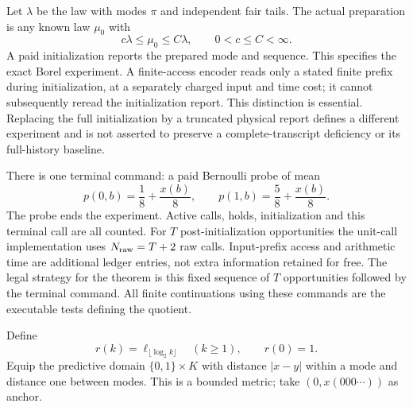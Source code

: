 Let $\lambda$ be the law with modes $\pi$ and independent fair tails. The actual preparation is any known law $\mu_0$ with
\begin{equation}\label{eq:nr-preparation}
 c\lambda\le\mu_0\le C\lambda,\qquad 0<c\le C<\infty.
\end{equation}
A paid initialization reports the prepared mode and sequence. This specifies the exact Borel experiment. A finite-access encoder reads only a stated finite prefix during initialization, at a separately charged input and time cost; it cannot subsequently reread the initialization report. This distinction is essential. Replacing the full initialization by a truncated physical report defines a different experiment and is not asserted to preserve a complete-transcript deficiency or its full-history baseline.

There is one terminal command: a paid Bernoulli probe of mean
\begin{equation}\label{eq:nr-score}
 p(0,b)=\frac18+\frac{x(b)}8,\qquad
 p(1,b)=\frac58+\frac{x(b)}8.
\end{equation}
The probe ends the experiment. Active calls, holds, initialization and this terminal call are all counted. For $T$ post-initialization opportunities the unit-call implementation uses $N_{\rm raw}=T+2$ raw calls. Input-prefix access and arithmetic time are additional ledger entries, not extra information retained for free. The legal strategy for the theorem is this fixed sequence of $T$ opportunities followed by the terminal command. All finite continuations using these commands are the executable tests defining the quotient.

Define
\begin{equation}\label{eq:nr-moran-profile}
 r(k)=\ell_{\lfloor\log_2 k\rfloor}\quad(k\ge1),\qquad r(0)=1.
\end{equation}
Equip the predictive domain $\{0,1\}\times K$ with distance $|x-y|$ within a mode and distance one between modes. This is a bounded metric; take $(0,x(000\cdots))$ as anchor.

